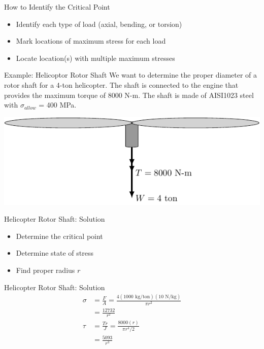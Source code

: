 \documentclass[10pt, svgnames]{beamer}
\begin{document}
\begin{frame}[label={sec:org307f207}]{How to Identify the Critical Point}
\begin{itemize}
\item Identify each type of load (axial, bending, or torsion)
\item Mark locations of maximum stress for each load
\item Locate location(s) with multiple maximum stresses
\end{itemize}
\end{frame}


\begin{frame}[label={sec:org5b6a30d}]{Example: Helicoptor Rotor Shaft}
We want to determine the proper diameter of a rotor shaft for a 4-ton helicopter. The shaft is connected to the engine that provides the maximum torque of 8000 N-m. The shaft is made of AISI1023 steel with \(\sigma_{allow}\) = 400 MPa.

\begin{center}
\includegraphics[width=.9\linewidth]{pictures/helicopter-example.pdf}
\end{center}
\end{frame}

\begin{frame}[label={sec:org893c7a0}]{Helicopter Rotor Shaft: Solution}
\begin{itemize}
\item Determine the critical point
\item Determine state of stress
\item Find proper radius \(r\)
\end{itemize}
\end{frame}

\begin{frame}[label={sec:org638be27}]{Helicopter Rotor Shaft: Solution}
\begin{align*}
  \sigma &= \frac{F}{A} = \frac{4(1000 \text{ kg/ton})(10 \text{ N/kg})}{\pi r^2} \\
         &= \frac{12732}{r^2} \\
  \tau &= \frac{Tr}{J} = \frac{8000(r)}{\pi r^4/2} \\
         &= \frac{5093}{r^3}
\end{align*}
\end{frame}
\end{document}
